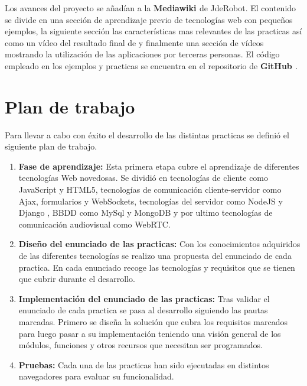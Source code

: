 Los avances del proyecto se añadían a la \textbf{Mediawiki \cite{Mediawiki}} de JdeRobot. El contenido se divide en una sección de aprendizaje previo de tecnologías web con  pequeños ejemplos, la siguiente sección las características mas relevantes de las practicas así como un vídeo del resultado final de y finalmente una sección de vídeos mostrando la utilización de las aplicaciones por terceras personas. El código empleado en los ejemplos y practicas se encuentra en el repositorio de \textbf{GitHub \cite{Repositorio}}.
\section{Plan de trabajo}
Para llevar a cabo con éxito el desarrollo de las distintas practicas se definió el siguiente plan de trabajo.
\begin{enumerate}
\item \textbf{Fase de aprendizaje:} Esta primera etapa cubre el aprendizaje de diferentes tecnologías Web novedosas. Se dividió en tecnologías de cliente como JavaScript y HTML5, tecnologías de comunicación cliente-servidor como Ajax, formularios y WebSockets, tecnologías del servidor como NodeJS y  Django , BBDD como  MySql y MongoDB y por ultimo tecnologías de comunicación audiovisual como WebRTC.
\item \textbf{Diseño del enunciado de las practicas:} Con los conocimientos adquiridos de las diferentes tecnologías se realizo una propuesta del enunciado de cada practica. En cada enunciado recoge las tecnologías y requisitos que se tienen que cubrir durante el desarrollo.
\item \textbf{Implementación del enunciado de las practicas:} Tras validar el enunciado de cada practica se pasa al desarrollo siguiendo las pautas marcadas. Primero se diseña la solución que cubra los requisitos marcados para luego pasar a su implementación teniendo una visión general de los módulos, funciones y otros recursos que necesitan ser programados.
\item \textbf{Pruebas:} Cada una de las practicas han sido ejecutadas en distintos navegadores para evaluar su funcionalidad.
\end{enumerate}
